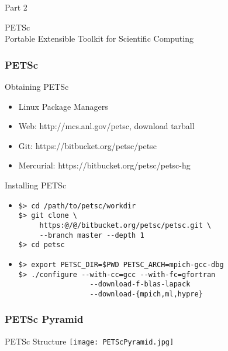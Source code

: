 

\begin{frame}{Part 2}
 \begin{center}
   \Huge PETSc \\[2em] \large Portable Extensible Toolkit for Scientific Computing
 \end{center}
\end{frame}



\begin{frame}[fragile]
\frametitle{PETSc}
 \begin{block}{Obtaining PETSc}
 \begin{itemize}
  \item Linux Package Managers
  \item Web: http://mcs.anl.gov/petsc, download tarball
  \item Git: https://bitbucket.org/petsc/petsc
  \item Mercurial: https://bitbucket.org/petsc/petsc-hg
 \end{itemize}
 \end{block}

 \begin{block}{Installing PETSc}
 \begin{itemize}
  \item
 \begin{lstlisting}[escapechar={@}]
$> cd /path/to/petsc/workdir
$> git clone \
     https:@/@/bitbucket.org/petsc/petsc.git \
     --branch master --depth 1
$> cd petsc
 \end{lstlisting}
  \item
 \begin{lstlisting}
$> export PETSC_DIR=$PWD PETSC_ARCH=mpich-gcc-dbg
$> ./configure --with-cc=gcc --with-fc=gfortran 
                 --download-f-blas-lapack
                 --download-{mpich,ml,hypre}
\end{lstlisting}
 \end{itemize}
 \end{block}

\end{frame}





\begin{frame}[fragile]
\frametitle{PETSc Pyramid}
 \begin{block}{PETSc Structure} \vspace{0.3cm}
   \texttt{[image: PETScPyramid.jpg]}
 \end{block}

\end{frame}




